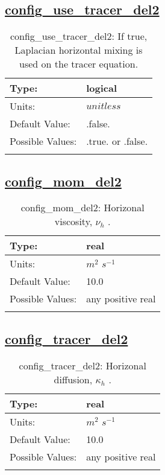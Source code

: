 \subsection[config\_use\_tracer\_del2]{\hyperref[sec:nm_tab_hmix_del2]{config\_use\_tracer\_del2}}
\label{subsec:nm_sec_config_use_tracer_del2}
\begin{center}
\begin{longtable}{| p{2.0in} || p{4.0in} |}
    \hline
    Type: & logical \\
    \hline
    Units: & $unitless$ \\
    \hline
    Default Value: & .false. \\
    \hline
    Possible Values: & .true. or .false. \\
    \hline
    \caption{config\_use\_tracer\_del2: If true, Laplacian horizontal mixing is used on the tracer equation.}
\end{longtable}
\end{center}
\subsection[config\_mom\_del2]{\hyperref[sec:nm_tab_hmix_del2]{config\_mom\_del2}}
\label{subsec:nm_sec_config_mom_del2}
\begin{center}
\begin{longtable}{| p{2.0in} || p{4.0in} |}
    \hline
    Type: & real \\
    \hline
    Units: & $m^2$ $s^{-1}$ \\
    \hline
    Default Value: & 10.0 \\
    \hline
    Possible Values: & any positive real \\
    \hline
    \caption{config\_mom\_del2:  Horizonal viscosity,  $\nu_h$ .}
\end{longtable}
\end{center}
\subsection[config\_tracer\_del2]{\hyperref[sec:nm_tab_hmix_del2]{config\_tracer\_del2}}
\label{subsec:nm_sec_config_tracer_del2}
\begin{center}
\begin{longtable}{| p{2.0in} || p{4.0in} |}
    \hline
    Type: & real \\
    \hline
    Units: & $m^2$ $s^{-1}$ \\
    \hline
    Default Value: & 10.0 \\
    \hline
    Possible Values: & any positive real \\
    \hline
    \caption{config\_tracer\_del2:  Horizonal diffusion,  $\kappa_h$ .}
\end{longtable}
\end{center}
